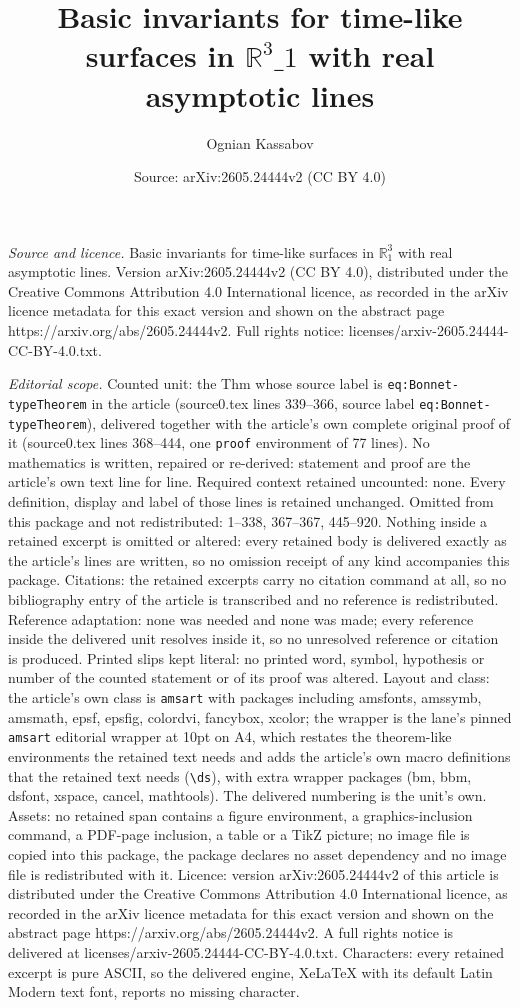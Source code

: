 \documentclass[10pt,a4paper]{amsart}
\title[Basic invariants for time-like surfaces in $\mathbb R^3\_1$ w]{Basic invariants for time-like surfaces in $\mathbb R^3\_1$ with real asymptotic lines}
\author{Ognian Kassabov}
\date{Source: arXiv:2605.24444v2 (CC BY 4.0)}
\begin{document}
\maketitle

\noindent\emph{Source and licence.} Basic invariants for time-like surfaces in $\mathbb R^3_1$ with real asymptotic lines. Version arXiv:2605.24444v2 (CC BY 4.0), distributed under the Creative Commons Attribution 4.0 International licence, as recorded in the arXiv licence metadata for this exact version and shown on the abstract page https://arxiv.org/abs/2605.24444v2. Full rights notice: licenses/arxiv-2605.24444-CC-BY-4.0.txt.\par\smallskip

\noindent\textit{Editorial scope.} Counted unit: the Thm whose source label is \texttt{eq:Bonnet-typeTheorem} in the article (source0.tex lines 339--366, source label \texttt{eq:Bonnet-typeTheorem}), delivered together with the article's own complete original proof of it (source0.tex lines 368--444, one \texttt{proof} environment of 77 lines). No mathematics is written, repaired or re-derived: statement and proof are the article's own text line for line. Required context retained uncounted: none. Every definition, display and label of those lines is retained unchanged. Omitted from this package and not redistributed: 1--338, 367--367, 445--920. Nothing inside a retained excerpt is omitted or altered: every retained body is delivered exactly as the article's lines are written, so no omission receipt of any kind accompanies this package. Citations: the retained excerpts carry no citation command at all, so no bibliography entry of the article is transcribed and no reference is redistributed. Reference adaptation: none was needed and none was made; every reference inside the delivered unit resolves inside it, so no unresolved reference or citation is produced. Printed slips kept literal: no printed word, symbol, hypothesis or number of the counted statement or of its proof was altered. Layout and class: the article's own class is \texttt{amsart} with packages including amsfonts, amssymb, amsmath, epsf, epsfig, colordvi, fancybox, xcolor; the wrapper is the lane's pinned \texttt{amsart} editorial wrapper at 10pt on A4, which restates the theorem-like environments the retained text needs and adds the article's own macro definitions that the retained text needs (\texttt{\textbackslash ds}), with extra wrapper packages (bm, bbm, dsfont, xspace, cancel, mathtools). The delivered numbering is the unit's own. Assets: no retained span contains a figure environment, a graphics-inclusion command, a PDF-page inclusion, a table or a TikZ picture; no image file is copied into this package, the package declares no asset dependency and no image file is redistributed with it. Licence: version arXiv:2605.24444v2 of this article is distributed under the Creative Commons Attribution 4.0 International licence, as recorded in the arXiv licence metadata for this exact version and shown on the abstract page https://arxiv.org/abs/2605.24444v2. A full rights notice is delivered at licenses/arxiv-2605.24444-CC-BY-4.0.txt. Characters: every retained excerpt is pure ASCII, so the delivered engine, XeLaTeX with its default Latin Modern text font, reports no missing character.
\end{document}
